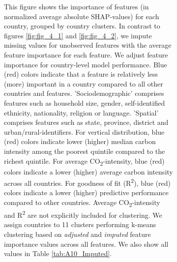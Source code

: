 \begin{figure}[ht!]
\begin{subfigure}[b]{\textwidth}
\begin{subcaption2}
    This figure shows the importance of features (in normalized average absolute SHAP-values) for each country, grouped by country clusters. In contrast to figures \ref{fig:fig_4_1} and \ref{fig:fig_4_2}, we impute missing values for unobserved features with the average feature importance for each feature. We adjust feature importance for country-level model performance. Blue (red) colors indicate that a feature is relatively less (more) important in a country compared to all other countries and features. 'Sociodemographic' comprises features such as household size, gender, self-identified ethnicity, nationality, religion or language. 'Spatial' comprises features such as state, province, district and urban/rural-identifiers. For vertical distribution, blue (red) colors indicate lower (higher) median carbon intensity among the poorest quintile compared to the richest quintile. For average CO\textsubscript{2}-intensity, blue (red) colors indicate a lower (higher) average carbon intensity across all countries. For goodness of fit (R\textsuperscript{2}), blue (red) colors indicate a lower (higher) predictive performance compared to other countries. Average CO\textsubscript{2}-intensity and R\textsuperscript{2} are not explicitly included for clustering.
    We assign countries to 11 clusters performing k-means clustering based on \textit{adjusted} and \textit{imputed} feature importance values across all features. We also show all values in Table \ref{tab:A10_Imputed}.
    \end{subcaption2}
    \end{subfigure}
    
\end{figure}
\clearpage